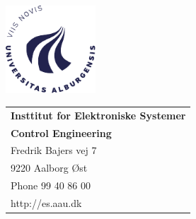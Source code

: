 \thispagestyle{empty}
\noindent
\begin{minipage}[l]{0.50\textwidth}
	\centering
	\includegraphics[width=3.35cm]{frontmatter/AAU_LAT_CIRCLE_blue_rgb}
\end{minipage}
\begin{minipage}[r]{0.50\textwidth}

\noindent
	\begin{tabular}{l}
		{\textsf{\small \textbf{Insttitut for Elektroniske Systemer}}}\\
		{\textsf{\small \textbf{Control Engineering}}} \\
		{\textsf{\small Fredrik Bajers vej 7}} \\
		{\textsf{\small 9220 Aalborg \O st}} \\
		{\textsf{\small Phone 99 40 86 00}} \\
		{\textsf{\small http://es.aau.dk}}
	\end{tabular}
\end{minipage}


